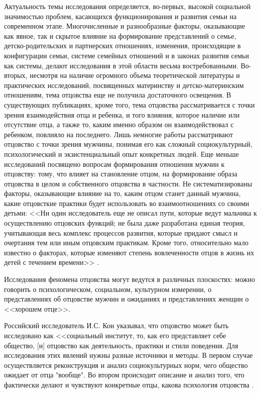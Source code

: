 \documentclass{../../common/thesisbyxetex}
\begin{document}
Актуальность темы исследования определяется, во-первых, высокой социальной значимостью проблем,
касающихся функционирования и развития семьи на современном этапе. Многочисленные и разнообразные
факторы, оказывающие как явное, так и скрытое влияние на формирование представлений о семье,
детско-родительских и партнерских отношениях, изменения, происходящие в конфигурации семьи, системе
семейных отношений и в законах развития семьи как системы, делают исследования в этой области
весьма востребованными. Во-вторых, несмотря на наличие огромного объема теоретической литературы и
практических исследований, посвященных материнству и детско-материнским отношениям, тема отцовства
еще не получила достаточного освещения. В существующих публикациях, кроме того, тема отцовства
рассматривается с точки зрения взаимодействия отца и ребенка, и того влияния, которое наличие
или отсутствие отца, а также то, каким именно образом он взаимодействовал с ребенком, повлияло на
последнего. Лишь немногие работы рассматривают отцовство с точки зрения мужчины,
понимая его как сложный социокультурный, психологический и экзистенциальный опыт конкретных людей.
Еще меньше исследований посвящено вопросам формирования отношения мужчин к отцовству:
тому, что влияет на становление отцом, на формирование образа отцовства в целом и собственного
отцовства в частности. Не систематизированы факторы, оказывающие влияние на то, каким отцом станет
данный мужчина, какие отцовсткие практики будет использовать во взаимоотношениях со своими детьми:
<<Ни один исследователь еще не описал пути, которые ведут мальчика к осуществлению отцовских
функций; не была даже разработана единая теория, учитывающая весь комплекс процессов развития,
которые придают смысл и очертания тем или иным отцовским практикам. Кроме того, относительно мало
известно о факторах, которые изменяют степень вовлеченности отцов в жизнь их детей с течением
времени>>  \cite[131]{f21}.





Исследования феномена отцовства могут ведутся  в различных плоскостях: можно говорить о 
психологическом, социальном, культурном измерении, о представлениях об отцовстве мужчин и ожиданиях 
и представлениях женщин о <<хорошем отце>>.

Российский исследователь И.С. Кон указывал, что отцовство может быть исследовано как <<социальный 
институт, то, как его представляет себе общество, [и] отцовство как деятельность, практики и 
стили поведения. Для исследования этих явлений нужны разные источники и методы. В первом случае 
осуществляется реконструкция и анализ социокультурных норм, чего общество ожидает от отца "вообще". 
Во втором происходит описание и анализ того, что фактически делают и чувствуют конкретные отцы, 
какова психология отцовства \cite[3]{konot}.
\end{document}

